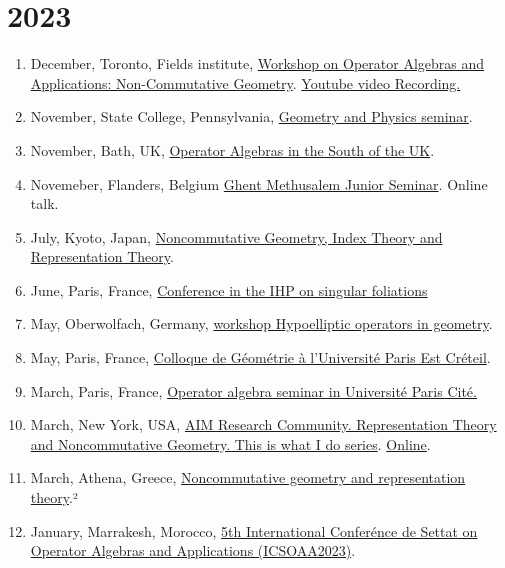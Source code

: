 \documentclass[a4paper, 13pt]{article}
\begin{document}
\section*{2023}
\begin{enumerate}
\item December, Toronto, Fields institute, \href{http://www.fields.utoronto.ca/activities/23-24/operator-noncommutative}{Workshop on Operator Algebras and Applications: Non-Commutative Geometry}. \href{https://www.youtube.com/watch?v=sufxJSKJ_qk&list=PLArBKNfJxuum6xCTUag8Yso0wnN8ayESE&index=21}{Youtube video Recording.}
\item November, State College, Pennsylvania, \href{https://math-cal.cloud.science.psu.edu/events/seminar/408}{Geometry and Physics seminar}.
\item November, Bath, UK, \href{https://sites.google.com/view/operatoralgebrasinthesouth/home}{Operator Algebras in the South of the UK}.
\item Novemeber, Flanders, Belgium \href{https://analysis-pde.org/ghent-methusalem-junior-seminar/}{Ghent Methusalem Junior Seminar}. Online talk.
\item July, Kyoto, Japan, \href{https://indico.math.cnrs.fr/event/8330/}{Noncommutative Geometry, Index Theory and Representation Theory}.
\item June, Paris, France, \href{https://indico.math.cnrs.fr/event/7893/timetable/}{Conference in the IHP on singular foliations}
\item May, Oberwolfach, Germany, \href{https://www.mfo.de/occasion/2321/www_view}{workshop Hypoelliptic operators in geometry}.
\item May, Paris, France, \href{https://fanoni.perso.math.cnrs.fr/colloque.html}{Colloque de Géométrie à l'Université Paris Est Créteil}.
\item March, Paris, France, \href{https://www.imj-prg.fr/ao/seminaires/}{Operator algebra seminar in Université Paris Cité.} 
\item March, New York, USA, \href{https://prclare.people.wm.edu/AIM_RTNCG/tiwid.php}{AIM Research Community. Representation Theory and Noncommutative Geometry. This is what I do series}. \href{}{Online}.
\item March, Athena, Greece, \href{https://conferences.uoa.gr/event/56/}{Noncommutative geometry and representation theory}.²
\item January, Marrakesh, Morocco, \href{https://sites.google.com/view/icsoaa-2023/}{5th International Conferénce de Settat on Operator Algebras and Applications (ICSOAA2023)}.
\end{enumerate}
\end{document}
